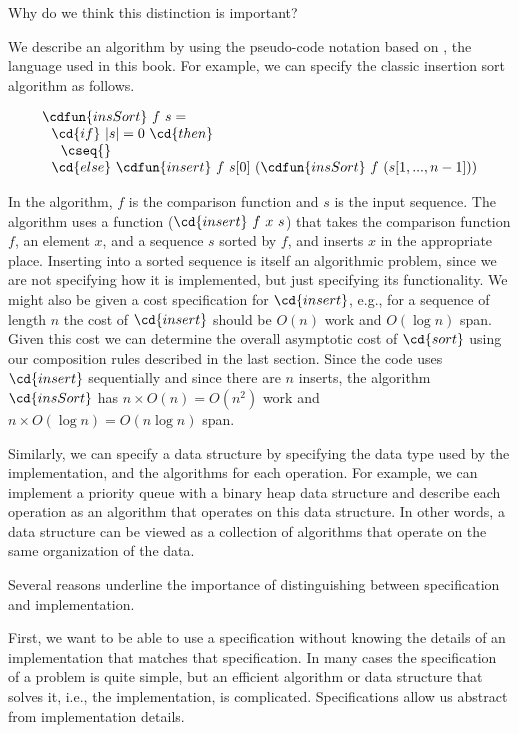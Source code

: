 Why do we think this distinction is important?

We describe an algorithm by using the pseudo-code notation based on
\pml, the language  used in this book.  For example, we can specify
the classic insertion sort algorithm as follows.
%

\[
\begin{array}{l}
\cdfun{insSort}~f~s =
\\ 
~~\cd{if}~|s| = 0~\cd{then} 
\\
~~~~\cseq{}
\\
~~\cd{else}~\cdfun{insert}~f~s[0]~(\cdfun{insSort}~f~(s[1,...,n-1]))
\end{array}
\]


In the algorithm, $f$ is the comparison function and $s$ is the input
sequence. %
The algorithm uses a function ($\cd{insert}~f~x~s$) that
takes the comparison function $f$, an element $x$, and a sequence $s$
sorted by $f$, and inserts $x$ in the appropriate place.  
%
Inserting into a sorted sequence is itself an algorithmic problem,
since we are not specifying how it is implemented, but just specifying
its functionality.  
%
We might also be given a cost specification for $\cd{insert}$, e.g., for
a sequence of length $n$ the cost of $\cd{insert}$ should be $O(n)$
work and $O(\log n)$ span.  
%
Given this cost we can determine the overall asymptotic cost of
$\cd{sort}$ using our composition rules described in the last section.
%
Since the code uses $\cd{insert}$ sequentially and since there are $n$
inserts, the algorithm $\cd{insSort}$ has $n \times O(n) =
O(n^2)$ work and $n \times O(\log n) = O(n \log n)$ span.

Similarly, we can specify a data structure by specifying the data type
used by the implementation, and the algorithms for each operation.
%
For example, we can implement a priority queue with a binary heap data
structure and describe each operation as an algorithm that operates on
this data structure.  In other words, a data structure can be viewed
as a collection of algorithms that operate on the same organization
of the data.

Several reasons underline the importance of distinguishing between
specification and implementation.  

First, we want to be able to use a specification without knowing the
details of an implementation that matches that specification.
%
In many cases the specification of a problem is quite simple, but an
efficient algorithm or data structure that solves it, i.e., the
implementation, is complicated.  
%
Specifications allow us abstract from implementation details.
%

